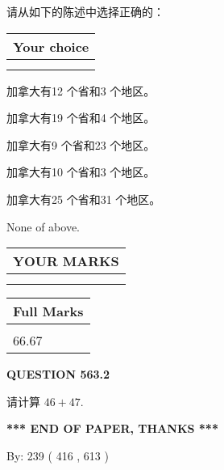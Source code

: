 \documentclass{ctexart}
\begin{document}
  
请从如下的陈述中选择正确的：
  
  
\noindent\hspace{3.0in} \begin{tabular}{|l|}
\hline
Your choice \\
\hline
 \\ 
 \\ 
\hline
\end{tabular}
  
  
 
 
加拿大有12 个省和3 个地区。
 
 
加拿大有19 个省和4 个地区。
 
 
加拿大有9 个省和23 个地区。
 
 
加拿大有10 个省和3 个地区。
 
 
加拿大有25 个省和31 个地区。
 
 
 None of above.
 
 
  
\vspace{0.2in}
  
\noindent\begin{tabular}{|l|}
\hline
 YOUR MARKS  \\
\hline
 \\ 
 \\ 
\hline
\end{tabular}
\hspace{0.05in} \begin{tabular}{|l|}
\hline
 Full Marks  \\
\hline
 \\ 
66.67 \\
\hline
\end{tabular}
{\textbf{\Large{QUESTION
563.2 
}}}
  
  
 
请计算 $ %
46 +  %
47 $.
 

 

 
   
   
 \vspace{0.2in}
 
   
   
   
   
\vspace{1.0in} 
{\textbf{\large{ *** END OF PAPER, THANKS *** }}} 
   
   
\hspace{1.0in} By: 
 239 ( 416 ,  613 )
   
\end{document}
